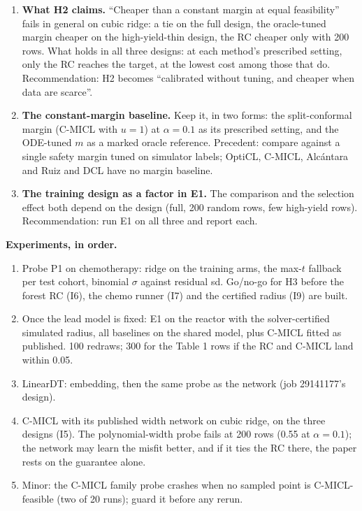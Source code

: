 \begin{tcolorbox}[breakable, colback=blue!3, colframe=blue!40!black,
  title={For JS and DB only; remove before circulating},
  fonttitle=\small\bfseries, left=4pt, right=4pt, top=3pt, bottom=3pt]
\begin{enumerate}
    no. It has no guarantee, two oracle-tuned parameters, and takes hours
    per cell.
  \item \textbf{What H2 claims.} ``Cheaper than a constant margin at equal
    feasibility'' fails in general on cubic ridge: a tie on the full design,
    the oracle-tuned margin cheaper on the high-yield-thin design, the RC
    cheaper only with 200 rows. What holds in all three designs: at each
    method's prescribed setting, only the RC reaches the target, at the
    lowest cost among those that do. Recommendation: H2 becomes
    ``calibrated without tuning, and cheaper when data are scarce''.
  \item \textbf{The constant-margin baseline.} Keep it, in two forms: the
    split-conformal margin (C-MICL with $u = 1$) at $\alpha = 0.1$ as its
    prescribed setting, and the ODE-tuned $m$ as a marked oracle reference.
    Precedent: \citet{cremer2019datadriven} compare against a single safety
    margin tuned on simulator labels; OptiCL, C-MICL, Alcántara and Ruiz
    and DCL have no margin baseline.
  \item \textbf{The training design as a factor in E1.} The comparison and
    the selection effect both depend on the design (full, 200 random rows,
    few high-yield rows). Recommendation: run E1 on all three and report
    each.
\end{enumerate}

\textbf{Experiments, in order.}
\begin{enumerate}
  \item Probe P1 on chemotherapy: ridge on the training arms, the max-$t$
    fallback per test cohort, binomial $\sigma$ against residual sd. Go/no-go
    for H3 before the forest RC (I6), the chemo runner (I7) and the certified
    radius (I9) are built.
  \item Once the lead model is fixed: E1 on the reactor with the
    solver-certified simulated radius, all baselines on the shared model,
    plus C-MICL fitted as published. 100 redraws; 300 for the Table 1 rows if
    the RC and C-MICL land within 0.05.
  \item LinearDT: embedding, then the same probe as the network (job
    29141177's design).
  \item C-MICL with its published width network on cubic ridge, on the three
    designs (I5). The polynomial-width probe fails at 200 rows (0.55 at
    $\alpha = 0.1$); the network may learn the misfit better, and if it ties
    the RC there, the paper rests on the guarantee alone.
  \item Minor: the C-MICL family probe crashes when no sampled point is
    C-MICL-feasible (two of 20 runs); guard it before any rerun.
\end{enumerate}


\end{tcolorbox}
